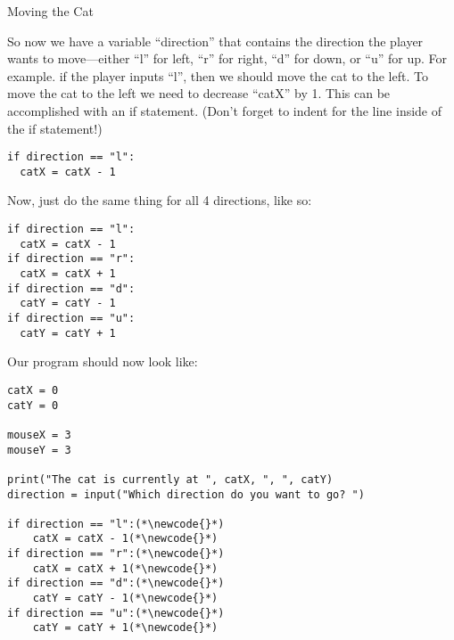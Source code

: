 \documentclass[12pt,oneside]{article}
\newcommand{\q}[1]{``#1''}
\newcommand{\subsectitle}[1]{
  \begin{flushleft}{\large#1}\end{flushleft}
}
\newcommand{\newcode}[0]{\hfill<--}
\begin{document}
\begin{minipage}{\textwidth}
\subsectitle{Moving the Cat}
So now we have a variable \q{direction} that contains the direction the player wants to move---either \q{l} for left, \q{r} for right, \q{d} for down, or \q{u} for up. For example. if the player inputs \q{l}, then we should move the cat to the left. To move the cat to the left we need to decrease \q{catX} by 1. This can be accomplished with an if statement. (Don't forget to indent for the line inside of the if statement!)

\begin{lstlisting}
if direction == "l":
  catX = catX - 1
\end{lstlisting}

Now, just do the same thing for all 4 directions, like so:

\begin{lstlisting}
if direction == "l":
  catX = catX - 1
if direction == "r":
  catX = catX + 1
if direction == "d":
  catY = catY - 1
if direction == "u":
  catY = catY + 1
\end{lstlisting}

Our program should now look like:

\begin{lstlisting}
catX = 0
catY = 0

mouseX = 3
mouseY = 3

print("The cat is currently at ", catX, ", ", catY)
direction = input("Which direction do you want to go? ")

if direction == "l":(*\newcode{}*)
    catX = catX - 1(*\newcode{}*)
if direction == "r":(*\newcode{}*)
    catX = catX + 1(*\newcode{}*)
if direction == "d":(*\newcode{}*)
    catY = catY - 1(*\newcode{}*)
if direction == "u":(*\newcode{}*)
    catY = catY + 1(*\newcode{}*)
\end{lstlisting}
\end{minipage}
\end{document}
